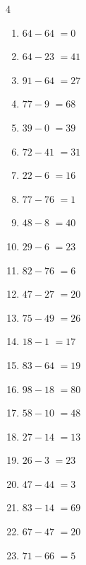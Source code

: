 \begin{multicols}{4}
\begin{enumerate}
  \item $64-64$
        $=0$

  \item $64-23$
        $=41$

  \item $91-64$
        $=27$

  \item $77-9$
        $=68$

  \item $39-0$
        $=39$

  \item $72-41$
        $=31$

  \item $22-6$
        $=16$

  \item $77-76$
        $=1$

  \item $48-8$
        $=40$

  \item $29-6$
        $=23$

  \item $82-76$
        $=6$

  \item $47-27$
        $=20$

  \item $75-49$
        $=26$

\columnbreak %

\resetques

  \item $18-1$
        $=17$

  \item $83-64$
        $=19$

  \item $98-18$
        $=80$

  \item $58-10$
        $=48$

  \item $27-14$
        $=13$

  \item $26-3$
        $=23$

  \item $47-44$
        $=3$

  \item $83-14$
        $=69$

  \item $67-47$
        $=20$

  \item $71-66$
        $=5$


\end{enumerate}
\end{multicols}
